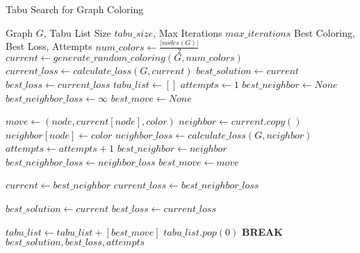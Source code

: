 \documentclass{article}
\begin{document}
\begin{algorithm}
\caption{Tabu Search for Graph Coloring}
\begin{algorithmic}[1]
\REQUIRE Graph $G$, Tabu List Size $tabu\_size$, Max Iterations $max\_iterations$
\ENSURE Best Coloring, Best Loss, Attempts
\STATE $num\_colors \gets \frac{|nodes(G)|}{2}$
\STATE $current \gets generate\_random\_coloring(G, num\_colors)$
\STATE $current\_loss \gets calculate\_loss(G, current)$
\STATE $best\_solution \gets current$
\STATE $best\_loss \gets current\_loss$
\STATE $tabu\_list \gets []$
\STATE $attempts \gets 1$
    \STATE $best\_neighbor \gets None$
    \STATE $best\_neighbor\_loss \gets \infty$
    \STATE $best\_move \gets None$
    
                \STATE $move \gets (node, current[node], color)$
                    \STATE $neighbor \gets current.copy()$
                    \STATE $neighbor[node] \gets color$
                    \STATE $neighbor\_loss \gets calculate\_loss(G, neighbor)$
                    \STATE $attempts \gets attempts + 1$
                        \STATE $best\_neighbor \gets neighbor$
                        \STATE $best\_neighbor\_loss \gets neighbor\_loss$
                        \STATE $best\_move \gets move$
                    \ENDIF
                \ENDIF
            \ENDIF
        \ENDFOR
    \ENDFOR
    
        \STATE $current \gets best\_neighbor$
        \STATE $current\_loss \gets best\_neighbor\_loss$
        
            \STATE $best\_solution \gets current$
            \STATE $best\_loss \gets current\_loss$
        \ENDIF
        
        \STATE $tabu\_list \gets tabu\_list + [best\_move]$
            \STATE $tabu\_list.pop(0)$
        \ENDIF
    \ELSE
        \STATE \textbf{BREAK}
    \ENDIF
\ENDWHILE
\RETURN $best\_solution, best\_loss, attempts$
\end{algorithmic}
\end{algorithm}
\end{document}
